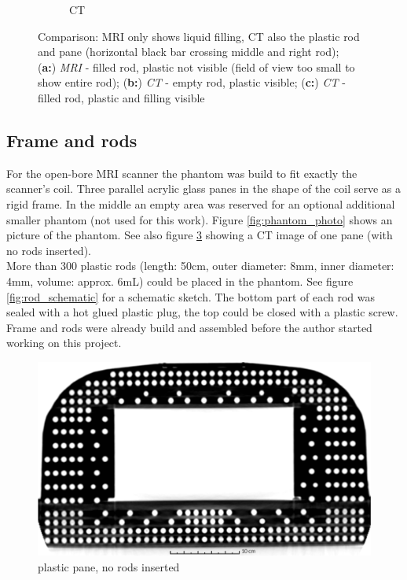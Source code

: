 \documentclass[parskip,bibtotoc,final,twoside=false,titlepage,a4paper,english,12pt,titlepage,a4paper]{scrbook}
\begin{document}
\begin{figure}[!htb]
\begin{subfigure}[b]{0.1\textwidth}
    \caption{CT}
    \label{fig:sagittal_comparison_ct}
  \end{subfigure}
  \caption{Comparison: MRI only shows liquid filling, CT also the plastic rod and pane (horizontal black bar crossing middle and right rod);\\ (\textbf{a:}) \textit{MRI} - filled rod, plastic not visible (field of view too small to show entire rod); (\textbf{b:}) \textit{CT} - empty rod, plastic visible; (\textbf{c:}) \textit{CT} - filled rod, plastic and filling visible}
  \label{fig:sagittal_comparison}
\end{figure}

\subsection{Frame and rods}

For the open-bore MRI scanner the phantom was build to fit exactly the scanner's coil.
Three parallel acrylic glass panes in the shape of the coil serve as a rigid frame.
In the middle an empty area was reserved for an optional additional smaller phantom (not used for this work).
Figure \ref{fig:phantom_photo} shows an picture of the phantom. See also figure \ref{fig:axial_CT_pane} showing a CT image of one pane (with no rods inserted). \\
More than 300 plastic rods (length: 50cm, outer diameter: 8mm, inner diameter: 4mm, volume: approx. 6mL) could be placed in the phantom.
See figure \ref{fig:rod_schematic} for a schematic sketch.
The bottom part of each rod was sealed with a hot glued plastic plug, the top could be closed with a plastic screw.
Frame and rods were already build and assembled before the author started working on this project.



\begin{figure}[!tbp]
\centering
\includegraphics[width=\textwidth]{slicer3D/full_phantom/axial_CT_pane.png}
\caption{plastic pane, no rods inserted}
\label{fig:axial_CT_pane}
\end{figure}
\end{document}
